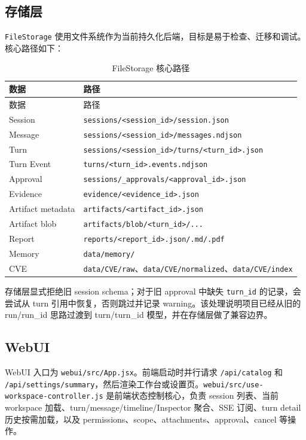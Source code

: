 \documentclass[UTF8,zihao=-4,a4paper,fontset=none]{ctexart}
\newcommand{\code}[1]{\texttt{\footnotesize #1}}
\begin{document}
\subsection{存储层}

\code{FileStorage} 使用文件系统作为当前持久化后端，目标是易于检查、迁移和调试。核心路径如下：

\begin{longtable}{L{0.25\textwidth}L{0.60\textwidth}}
\caption{FileStorage 核心路径}\label{tab:storage}\\
\toprule
数据 & 路径 \\
\midrule
\endfirsthead
\toprule
数据 & 路径 \\
\midrule
\endhead
Session & \code{sessions/<session\_id>/session.json} \\
Message & \code{sessions/<session\_id>/messages.ndjson} \\
Turn & \code{sessions/<session\_id>/turns/<turn\_id>.json} \\
Turn Event & \code{turns/<turn\_id>.events.ndjson} \\
Approval & \code{sessions/\_approvals/<approval\_id>.json} \\
Evidence & \code{evidence/<evidence\_id>.json} \\
Artifact metadata & \code{artifacts/<artifact\_id>.json} \\
Artifact blob & \code{artifacts/blob/<turn\_id>/...} \\
Report & \code{reports/<report\_id>.json/.md/.pdf} \\
Memory & \code{data/memory/} \\
CVE & \code{data/CVE/raw}、\code{data/CVE/normalized}、\code{data/CVE/index} \\
\bottomrule
\end{longtable}

存储层显式拒绝旧 session schema；对于旧 approval 中缺失 \code{turn\_id} 的记录，会尝试从 turn 引用中恢复，否则跳过并记录 warning。该处理说明项目已经从旧的 run/run\_id 思路过渡到 turn/turn\_id 模型，并在存储层做了兼容边界。

\subsection{WebUI}

WebUI 入口为 \code{webui/src/App.jsx}。前端启动时并行请求 \code{/api/catalog} 和 \code{/api/settings/summary}，然后渲染工作台或设置页。\code{webui/src/use-workspace-controller.js} 是前端状态控制核心，负责 session 列表、当前 workspace 加载、turn/message/timeline/Inspector 聚合、SSE 订阅、turn detail 历史按需加载，以及 permissions、scope、attachments、approval、cancel 等操作。
\end{document}

